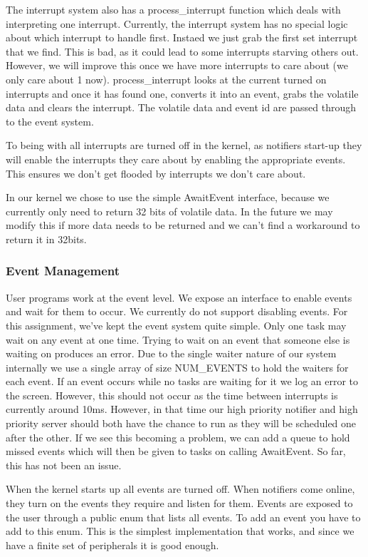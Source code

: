 \documentclass{article}
\begin{document}
The interrupt system also has a process\_interrupt function which deals with interpreting one interrupt. Currently, the interrupt system has no special logic about which interrupt to handle first. Instaed we just grab the first set interrupt that we find. This is bad, as it could lead to some interrupts starving others out. However, we will improve this once we have more interrupts to care about (we only care about 1 now). process\_interrupt looks at the current turned on interrupts and once it has found one, converts it into an event, grabs the volatile data and clears the interrupt. The volatile data and event id are passed through to the event system.

To being with all interrupts are turned off in the kernel, as notifiers start-up they will enable the interrupts they care about by enabling the appropriate events. This ensures we don't get flooded by interrupts we don't care about.

In our kernel we chose to use the simple AwaitEvent interface, because we currently only need to return 32 bits of volatile data. In the future we may modify this if more data needs to be returned and we can't find a workaround to return it in 32bits.

\subsubsection{Event Management}

User programs work at the event level. We expose an interface to enable events and wait for them to occur. We currently do not support disabling events. For this assignment, we've kept the event system quite simple. Only one task may wait on any event at one time. Trying to wait on an event that someone else is waiting on produces an error. Due to the single waiter nature of our system internally we use a single array of size NUM\_EVENTS to hold the waiters for each event. If an event occurs while no tasks are waiting for it we log an error to the screen. However, this should not occur as the time between interrupts is currently around 10ms. However, in that time our high priority notifier and high priority server should both have the chance to run as they will be scheduled one after the other. If we see this becoming a problem, we can add a queue to hold missed events which will then be given to tasks on calling AwaitEvent. So far, this has not been an issue.

When the kernel starts up all events are turned off. When notifiers come online, they turn on the events they require and listen for them. Events are exposed to the user through a public enum that lists all events. To add an event you have to add to this enum. This is the simplest implementation that works, and since we have a finite set of peripherals it is good enough.
\end{document}
